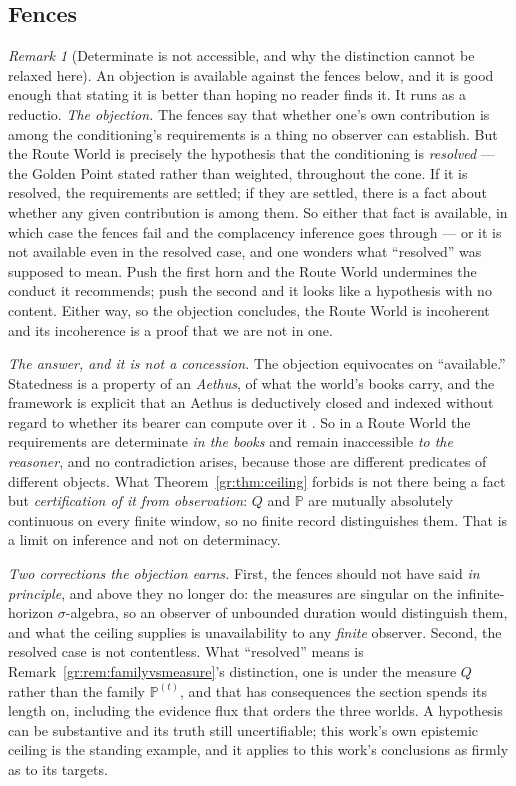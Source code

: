 \documentclass[11pt]{article}
\numberwithin{equation}{section}
\theoremstyle{plain}
\theoremstyle{definition}
\theoremstyle{remark}
\newtheorem{remark}[theorem]{Remark}
\newcommand{\PP}{\mathbb{P}}
\begin{document}
\subsection{Fences}\label{gc:sub:routefences}

\begin{remark}[Determinate is not accessible, and why the distinction
cannot be relaxed here]\label{gc:rem:determinacygap}
An objection is available against the fences below, and it is good enough
that stating it is better than hoping no reader finds it. It runs as a
reductio. \emph{The objection.} The fences say that whether one's own contribution
is among the conditioning's requirements is a thing no observer can
establish. But the Route World is precisely the hypothesis that the
conditioning is \emph{resolved} --- the Golden Point stated rather than
weighted, throughout the cone. If it is resolved, the requirements are
settled; if they are settled, there is a fact about whether any given
contribution is among them. So either that fact is available, in which
case the fences fail and the complacency inference goes through --- or it
is not available even in the resolved case, and one wonders what
``resolved'' was supposed to mean. Push the first horn and the Route
World undermines the conduct it recommends; push the second and it looks
like a hypothesis with no content. Either way, so the objection
concludes, the Route World is incoherent and its incoherence is a proof
that we are not in one.

\emph{The answer, and it is not a concession.} The objection equivocates
on ``available.'' Statedness is a property of an \emph{Aethus}, of
what the world's books carry, and the framework is explicit that an
Aethus is deductively closed and indexed without regard to whether its
bearer can compute over it \cite{Aethus}. So in a Route World the
requirements are determinate \emph{in the books} and remain inaccessible
\emph{to the reasoner}, and no contradiction arises, because those are
different predicates of different objects. What
Theorem~\ref{gr:thm:ceiling} forbids is not there being a fact but
\emph{certification of it from observation}: $Q$ and $\PP$ are mutually
absolutely continuous on every finite window, so no finite record
distinguishes them. That is a limit on inference and not on determinacy.

\emph{Two corrections the objection earns.} First, the fences should not
have said \emph{in principle}, and above they no longer do: the measures
are singular on the infinite-horizon $\sigma$-algebra, so an observer of
unbounded duration would distinguish them, and what the ceiling supplies
is unavailability to any \emph{finite} observer. Second, the resolved
case is not contentless. What ``resolved'' means is
Remark~\ref{gr:rem:familyvsmeasure}'s distinction, one is under the
measure $Q$ rather than the family $\PP^{(t)}$, and that has
consequences the section spends its length on, including the evidence
flux that orders the three worlds. A hypothesis can be substantive and
its truth still uncertifiable; this work's own epistemic ceiling is the
standing example, and it applies to this work's conclusions as firmly as
to its targets.


\end{remark}
\end{document}
